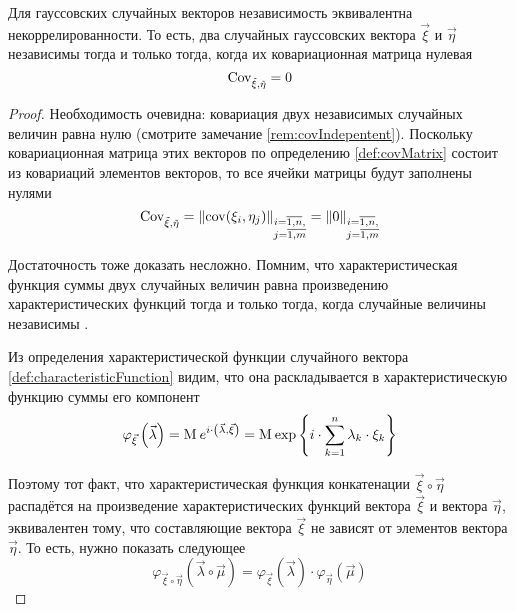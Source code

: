\begin{theorem}
    \label{theorem:gaussianVector:independence}
    Для гауссовских случайных векторов независимость эквивалентна
    некоррелированности.
    То есть, два случайных гауссовских вектора $\vec{\xi}$ и $\vec{\eta}$
    независимы тогда и только тогда, когда их ковариационная матрица нулевая
    $$\operatorname{Cov^{}_{\vec{\xi}, \vec{\eta}}} = 0$$
\end{theorem}
\begin{proof}
    Необходимость очевидна: ковариация двух независимых случайных величин равна
    нулю (смотрите замечание \ref{rem:covIndepentent}). Поскольку
    ковариационная матрица этих векторов по определению \ref{def:covMatrix}
    состоит из ковариаций элементов векторов, то все ячейки матрицы будут
    заполнены нулями
    $$\operatorname{Cov^{}_{\vec{\xi}, \vec{\eta}}}
        = \left\| \operatorname{cov}\!\left( \xi_i, \eta_j \right) \right\|_{
            \substack{i=\overline{1,n},\\j=\overline{1,m}}}
        = \left\| 0 \right \|_{
            \substack{i=\overline{1,n},\\j=\overline{1,m}}}$$

    Достаточность тоже доказать несложно. Помним, что характеристическая
    функция суммы двух случайных величин равна произведению характеристических
    функций тогда и только тогда, когда случайные величины независимы
    \cite[с.~354]{Shiryayev1}.

    Из определения характеристической функции случайного вектора
    \ref{def:characteristicFunction} видим, что она раскладывается в
    характеристическую функцию суммы его компонент
    $$\varphi_{\vec{\xi}}\left( \vec{\lambda} \right)
        = \operatorname{M}_{} e^{i \cdot \left( \vec{\lambda}, \vec{\xi} \right)}
        = \operatorname{M}_{} 
            \exp{\left\{ i \cdot \sum_{k=1}^n \lambda_k \cdot \xi_k \right\}}$$

    Поэтому тот факт, что характеристическая функция конкатенации
    $\vec{\xi} \circ \vec{\eta}$ распадётся на произведение характеристических
    функций вектора $\vec{\xi}$ и вектора $\vec{\eta}$, эквивалентен тому, что
    составляющие вектора $\vec{\xi}$ не зависят от элементов вектора
    $\vec{\eta}$. То есть, нужно показать следующее
    $$\varphi_{\vec{\xi} \circ \vec{\eta}}\left(
            \vec{\lambda} \circ \vec{\mu} \right)
        = \varphi_{\vec{\xi}}\left( \vec{\lambda} \right)
            \cdot \varphi_{\vec{\eta}}\left( \vec{\mu} \right)$$


\end{proof}
